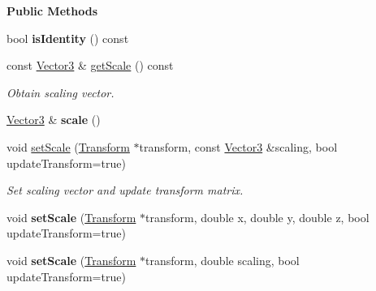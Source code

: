 \begin{Indent}\textbf{ Public Methods}\par
\begin{DoxyCompactItemize}
\item 
\mbox{\label{classrev_1_1_scale_component_a0545ed9274104bf4b69adb69be1f8560}} 
bool {\bfseries is\+Identity} () const
\item 
\mbox{\label{classrev_1_1_scale_component_a26a2b70610802ef247b21082d3520a16}} 
const \mbox{\hyperlink{classrev_1_1_vector}{Vector3}} \& \mbox{\hyperlink{classrev_1_1_scale_component_a26a2b70610802ef247b21082d3520a16}{get\+Scale}} () const
\begin{DoxyCompactList}\small\item\em Obtain scaling vector. \end{DoxyCompactList}\item 
\mbox{\label{classrev_1_1_scale_component_a2ef1b1d31605a2fa8e4e898a18dcbb01}} 
\mbox{\hyperlink{classrev_1_1_vector}{Vector3}} \& {\bfseries scale} ()
\item 
\mbox{\label{classrev_1_1_scale_component_a817dccc097f138b2f61cacc6e2212a94}} 
void \mbox{\hyperlink{classrev_1_1_scale_component_a817dccc097f138b2f61cacc6e2212a94}{set\+Scale}} (\mbox{\hyperlink{classrev_1_1_transform}{Transform}} $\ast$transform, const \mbox{\hyperlink{classrev_1_1_vector}{Vector3}} \&scaling, bool update\+Transform=true)
\begin{DoxyCompactList}\small\item\em Set scaling vector and update transform matrix. \end{DoxyCompactList}\item 
\mbox{\label{classrev_1_1_scale_component_a320143d3ebaa71e2e2176109f747ac8c}} 
void {\bfseries set\+Scale} (\mbox{\hyperlink{classrev_1_1_transform}{Transform}} $\ast$transform, double x, double y, double z, bool update\+Transform=true)
\item 
\mbox{\label{classrev_1_1_scale_component_a365acf6010e71727308a16a6db336f35}} 
void {\bfseries set\+Scale} (\mbox{\hyperlink{classrev_1_1_transform}{Transform}} $\ast$transform, double scaling, bool update\+Transform=true)
\end{DoxyCompactItemize}
\end{Indent}
